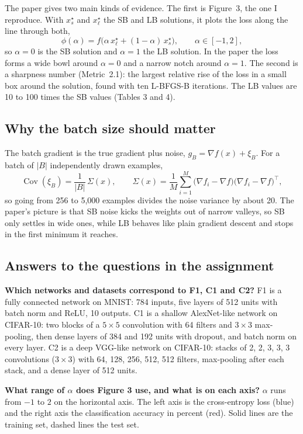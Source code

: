 The paper gives two main kinds of evidence. The first is Figure~3, the one I reproduce. With $x_s^\star$ and $x_\ell^\star$ the SB and LB solutions, it plots the loss along the line through both,
\[
\phi(\alpha)=f\big(\alpha\,x_\ell^\star+(1-\alpha)\,x_s^\star\big),\qquad \alpha\in[-1,2],
\]
so $\alpha=0$ is the SB solution and $\alpha=1$ the LB solution. In the paper the loss forms a wide bowl around $\alpha=0$ and a narrow notch around $\alpha=1$. The second is a sharpness number (Metric~2.1): the largest relative rise of the loss in a small box around the solution, found with ten L-BFGS-B iterations. The LB values are 10 to 100 times the SB values (Tables 3 and 4).

\subsection{Why the batch size should matter}
The batch gradient is the true gradient plus noise, $g_B=\nabla f(x)+\xi_B$. For a batch of $|B|$ independently drawn examples,
\[
\operatorname{Cov}(\xi_B)=\frac{1}{|B|}\,\Sigma(x),\qquad \Sigma(x)=\frac1M\sum_{i=1}^M\big(\nabla f_i-\nabla f\big)\big(\nabla f_i-\nabla f\big)^{\!\top},
\]
so going from 256 to 5{,}000 examples divides the noise variance by about 20. The paper's picture is that SB noise kicks the weights out of narrow valleys, so SB only settles in wide ones, while LB behaves like plain gradient descent and stops in the first minimum it reaches.

\subsection{Answers to the questions in the assignment}
\textbf{Which networks and datasets correspond to F1, C1 and C2?} F1 is a fully connected network on MNIST: 784 inputs, five layers of 512 units with batch norm and ReLU, 10 outputs. C1 is a shallow AlexNet-like network on CIFAR-10: two blocks of a $5\times5$ convolution with 64 filters and $3\times3$ max-pooling, then dense layers of 384 and 192 units with dropout, and batch norm on every layer. C2 is a deep VGG-like network on CIFAR-10: stacks of 2, 2, 3, 3, 3 convolutions ($3\times3$) with 64, 128, 256, 512, 512 filters, max-pooling after each stack, and a dense layer of 512 units.

\textbf{What range of $\alpha$ does Figure 3 use, and what is on each axis?} $\alpha$ runs from $-1$ to $2$ on the horizontal axis. The left axis is the cross-entropy loss (blue) and the right axis the classification accuracy in percent (red). Solid lines are the training set, dashed lines the test set.

